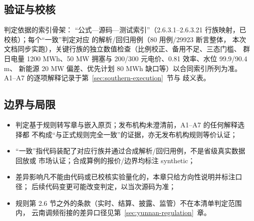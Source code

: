 \subsection{验证与校核}
判定依据的索引骨架：
“公式—源码—测试索引”（2.6.3.1--2.6.3.21 行族映射，已校核）；每个“一致”判定对应
 的解析/回归用例（80 用例/29923 断言整体，
本次文档同步实跑），关键行族的独立数值检查（比例校正、备用不足、三态门槛、
群日电量 1200 MWh、50 MW 拥塞与 200/300 元电价、0.81 效率、水位 99.9/90.4 m、
新能源 20 MW 偏差、优先计划 80 MWh 缺口等）以合同索引所列为准。
A1--A7 的逐项解释记录于第~\ref{sec:southern-execution}~节与
 歧义表。

\subsection{边界与局限}
\begin{itemize}
  \item 判定基于规则转写章与嵌入原页；发布机构未澄清前，A1--A7 的任何解释选择都
        不构成“与正式规则完全一致”的证据，亦无发布机构规则等价认证；
  \item “一致”指代码装配了对应行族并通过合成解析/回归用例，不是省级真实数据回放或
        市场认证；合成算例的报价/边界均标注 synthetic；
  \item 差异影响凡不能由代码或已校核实验量化的，本章只给方向性说明并标注口径；
        后续代码变更可能改变判定，以当次源码为准；
  \item 规则第 2.6 节之外的条款（实时、结算、披露、监管）不在本清单判定范围内，
        云南调频衔接的差异口径见第~\ref{sec:yunnan-regulation}~章。
\end{itemize}
